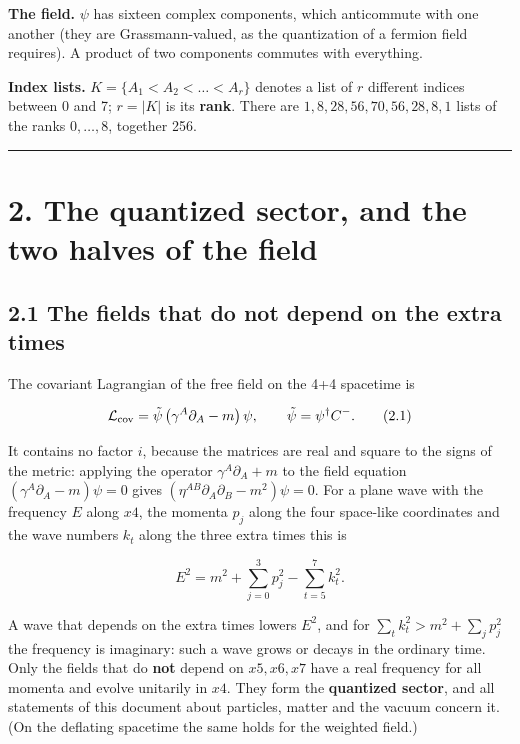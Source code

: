 \documentclass[
  10pt,
]{article}
\begin{document}
\textbf{The field.} \(\psi\) has sixteen complex components, which
anticommute with one another (they are Grassmann-valued, as the
quantization of a fermion field requires). A product of two components
commutes with everything.

\textbf{Index lists.} \(K=\{A_1<A_2<\dots<A_r\}\) denotes a list of
\(r\) different indices between 0 and 7; \(r=|K|\) is its \textbf{rank}.
There are \(1,8,28,56,70,56,28,8,1\) lists of the ranks \(0,\dots,8\),
together 256.

\begin{center}\rule{0.5\linewidth}{0.5pt}\end{center}

\hypertarget{the-quantized-sector-and-the-two-halves-of-the-field}{%
\section{2. The quantized sector, and the two halves of the
field}\label{the-quantized-sector-and-the-two-halves-of-the-field}}

\hypertarget{the-fields-that-do-not-depend-on-the-extra-times}{%
\subsection{2.1 The fields that do not depend on the extra
times}\label{the-fields-that-do-not-depend-on-the-extra-times}}

The covariant Lagrangian of the free field on the 4+4 spacetime is

\[\mathcal L_{\rm cov}=\tilde\psi\,\big(\gamma^A\partial_A-m\big)\,\psi,\qquad\tilde\psi=\psi^\dagger C^-.\tag{2.1}\]

It contains no factor \(i\), because the matrices are real and square to
the signs of the metric: applying the operator \(\gamma^A\partial_A+m\)
to the field equation \((\gamma^A\partial_A-m)\psi=0\) gives
\((\eta^{AB}\partial_A\partial_B-m^2)\psi=0\). For a plane wave with the
frequency \(E\) along \(x4\), the momenta \(p_j\) along the four
space-like coordinates and the wave numbers \(k_t\) along the three
extra times this is

\[E^2=m^2+\sum_{j=0}^{3}p_j^2-\sum_{t=5}^{7}k_t^2.\tag{2.2}\]

A wave that depends on the extra times lowers \(E^2\), and for
\(\sum_tk_t^2>m^2+\sum_jp_j^2\) the frequency is imaginary: such a wave
grows or decays in the ordinary time. Only the fields that do
\textbf{not} depend on \(x5,x6,x7\) have a real frequency for all
momenta and evolve unitarily in \(x4\). They form the \textbf{quantized
sector}, and all statements of this document about particles, matter and
the vacuum concern it. (On the deflating spacetime the same holds for
the weighted field.)
\end{document}
